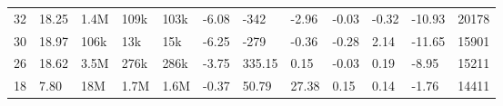 \begin{table}[ht]
\begin{tabularx}{\textwidth}{@{} r *{10}{X} r @{}}
        \footnotesize 32 & 
        \cellcolor[HTML]{F0F9F5}\footnotesize 18.25 & 
        \cellcolor[HTML]{F3FAF7}\footnotesize 1.4M & 
        \cellcolor[HTML]{F6FCF9}\footnotesize 109k & 
        \cellcolor[HTML]{F6FCF9}\footnotesize 103k & 
        \cellcolor[HTML]{F8FCFA}\footnotesize -6.08 & 
        \cellcolor[HTML]{FFFFFF}\footnotesize -342 & 
        \cellcolor[HTML]{E7F5EE}\footnotesize -2.96 & 
        \footnotesize -0.03 & 
        \cellcolor[HTML]{ACDEC6}\footnotesize -0.32 & 
        \cellcolor[HTML]{F3FBF7}\footnotesize -10.93 & 
        \footnotesize 20178 \\

        \footnotesize 30 & 
        \cellcolor[HTML]{FBFDFC}\footnotesize 18.97 & 
        \cellcolor[HTML]{FFFFFF}\footnotesize 106k & 
        \cellcolor[HTML]{FFFFFF}\footnotesize 13k & 
        \cellcolor[HTML]{FFFFFF}\footnotesize 15k & 
        \cellcolor[HTML]{FDFEFD}\footnotesize -6.25 & 
        \cellcolor[HTML]{F0F9F5}\footnotesize -279 & 
        \cellcolor[HTML]{DAF0E6}\footnotesize -0.36 & 
        \footnotesize -0.28 & 
        \cellcolor[HTML]{9CD7BA}\footnotesize 2.14 & 
        \cellcolor[HTML]{FFFFFF}\footnotesize -11.65 & 
        \footnotesize 15901 \\

        \footnotesize 26 & 
        \cellcolor[HTML]{F6FBF8}\footnotesize 18.62 & 
        \cellcolor[HTML]{DFF2E9}\footnotesize 3.5M & 
        \cellcolor[HTML]{E6F5ED}\footnotesize 276k & 
        \cellcolor[HTML]{E3F4EC}\footnotesize 286k & 
        \cellcolor[HTML]{B6E2CD}\footnotesize -3.75 & 
        \cellcolor[HTML]{57BB8A}\footnotesize 335.15 & 
        \cellcolor[HTML]{D8F0E4}\footnotesize 0.15 & 
        \footnotesize -0.03 & 
        \cellcolor[HTML]{A9DCC3}\footnotesize 0.19 & 
        \cellcolor[HTML]{D2EDE0}\footnotesize -8.95 & 
        \footnotesize 15211 \\

        \footnotesize 18 & 
        \cellcolor[HTML]{57BB8A}\footnotesize 7.80 & 
        \cellcolor[HTML]{57BB8A}\footnotesize 18M & 
        \cellcolor[HTML]{57BB8A}\footnotesize 1.7M & 
        \cellcolor[HTML]{57BB8A}\footnotesize 1.6M & 
        \cellcolor[HTML]{57BB8A}\footnotesize -0.37 & 
        \cellcolor[HTML]{9ED8BC}\footnotesize 50.79 & 
        \cellcolor[HTML]{57BB8A}\footnotesize 27.38 & 
        \footnotesize 0.15 & 
        \cellcolor[HTML]{A9DDC4}\footnotesize 0.14 & 
        \cellcolor[HTML]{57BB8A}\footnotesize -1.76 & 
        \footnotesize 14411 \\


\end{tabularx}
\end{table}
